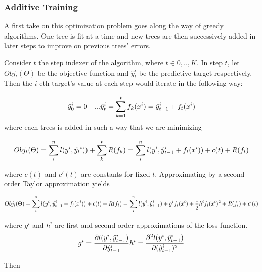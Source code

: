 \subsubsection{Additive Training}

A first take on this optimization problem goes along the way of greedy algorithms. One tree is fit at a time and new trees are then successively added in later steps to improve on previous trees' errors.

Consider $t$ the step indexer of the algorithm, where $t \in {0,..,K}$. In step $t$, let $Obj_t(\Theta)$ be the objective function and $\hat{y}_t^i$ be the predictive target respectively. Then the $i$-eth target's value at each step would iterate in the following way:

\begin{equation} \label{eq:gb-targetSteps}
\hat{y}_0^i = 0 \\
 \ \ \ ... \\ 
 \hat{y}_t^i = \sum_{k=1}^{t} f_k(x^i) = \hat{y}_{t-1}^i +  f_t(x^i)

\end{equation}
where each trees is added in such a way that we are minimizing

\[
Obj_t(\Theta) = \sum_i^n l(y^i,\hat{y_t}^i)) +   \sum_k^t R(f_k) \\
= \sum_i^n l(y^i,\hat{y}_{t-1}^i +  f_t(x^i) ) +   c(t) + R(f_t) \\
\]

where $c(t)$ and $c'(t)$ are constants for fixed $t$. Approximating by a second order Taylor approximation yields

\[
    Obj_t(\Theta) = \sum_i^n l(y^i, \hat{y}_{t-1}^i +  f_t(x^i) ) + c(t) + R(f_t) \\
    = \sum_i^n {l(y^i, \hat{y}_{t-1}^i) + g^i f_t(x^i) + \frac{1}{2} h^i f_t(x^i)^2 } +  R(f_t) +  c'(t)
\]

where $g^i$ and $h^i$ are first and second order approximations of the loss function.
\[
    g^i =  \frac{\partial l(y^i, \hat{y}_{t-1}^i)}{\partial \hat{y}_{t-1}^i} \\
    h^i =  \frac{\partial^2 l(y^i, \hat{y}_{t-1}^i)}{\partial (\hat{y}_{t-1}^i)^2 }
\]

Then

